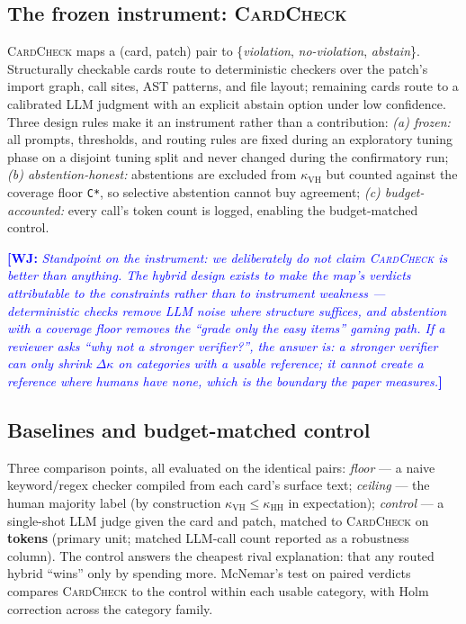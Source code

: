 \documentclass[conference]{IEEEtran}
\newcommand{\wj}[1]{\textcolor{blue}{\textbf{[WJ:} \textit{#1}\textbf{]}}}
\newcommand{\ph}[1]{\colorbox{yellow!35}{\texttt{\footnotesize #1}}}
\newcommand{\cardcheck}{\textsc{CardCheck}}
\newcommand{\kh}{\kappa_{\mathrm{HH}}}
\newcommand{\kv}{\kappa_{\mathrm{VH}}}
\newcommand{\dk}{\Delta\kappa}
\begin{document}
\subsection{The frozen instrument: \cardcheck{}}\label{sec:design:instrument}
\cardcheck{} maps a (card, patch) pair to \{\emph{violation},
\emph{no-violation}, \emph{abstain}\}. Structurally checkable cards route to
deterministic checkers over the patch's import graph, call sites, AST patterns,
and file layout; remaining cards route to a calibrated LLM judgment with an
explicit abstain option under low confidence. Three design rules make it an
instrument rather than a contribution:
\emph{(a) frozen:} all prompts, thresholds, and routing rules are fixed during
an exploratory tuning phase on a disjoint tuning split and never changed during
the confirmatory run;
\emph{(b) abstention-honest:} abstentions are excluded from $\kv$ but counted
against the coverage floor \ph{C*}, so selective abstention cannot buy
agreement;
\emph{(c) budget-accounted:} every call's token count is logged, enabling the
budget-matched control.

\wj{Standpoint on the instrument: we deliberately do not claim
\cardcheck{} is better than anything. The hybrid design exists to make the map's
verdicts attributable to the \emph{constraints} rather than to instrument
weakness --- deterministic checks remove LLM noise where structure suffices,
and abstention with a coverage floor removes the ``grade only the easy items''
gaming path. If a reviewer asks ``why not a stronger verifier?'', the answer
is: a stronger verifier can only shrink $\dk$ on categories with a usable
reference; it cannot create a reference where humans have none, which is the
boundary the paper measures.}

\subsection{Baselines and budget-matched control}\label{sec:design:baselines}
Three comparison points, all evaluated on the identical pairs:
\emph{floor} --- a naive keyword/regex checker compiled from each card's
surface text;
\emph{ceiling} --- the human majority label (by construction $\kv \leq \kh$ in
expectation);
\emph{control} --- a single-shot LLM judge given the card and patch, matched to
\cardcheck{} on \textbf{tokens} (primary unit; matched LLM-call count reported
as a robustness column). The control answers the cheapest rival explanation:
that any routed hybrid ``wins'' only by spending more.
McNemar's test on paired verdicts compares \cardcheck{} to the control within
each usable category, with Holm correction across the category family.
\end{document}
